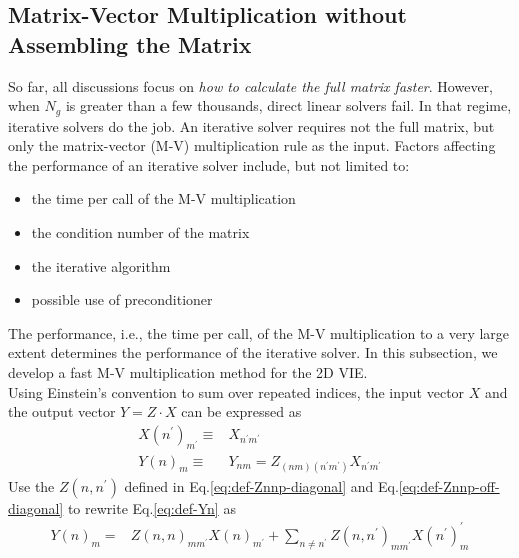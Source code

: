 \documentclass [10pt,letterpaper]{article}
\begin{document}
\subsection{Matrix-Vector Multiplication without Assembling the Matrix}
\label{sub:matrix-vector-multiplication-without-assembling-the-matrix}
So far, all discussions focus on \emph{how to calculate the full matrix faster}.
However, when $N_g$ is greater than a few thousands, direct linear solvers fail. 
In that regime, iterative solvers do the job. 
An iterative solver requires not the full matrix, but only the matrix-vector (M-V) multiplication rule as the input. 
Factors affecting the performance of an iterative solver include, but not limited to:
\begin{itemize}
	\item the time per call of the M-V multiplication
	\item the condition number of the matrix
	\item the iterative algorithm
	\item possible use of preconditioner
\end{itemize}
The performance, i.e., the time per call, of the M-V multiplication to a very large extent determines the performance of the iterative solver.  
In this subsection, we develop a fast M-V multiplication method for the 2D VIE.
\\
Using Einstein's convention to sum over repeated indices, the input vector $X$ and the output vector $Y=Z\cdot X$ can be expressed as
\begin{subequations} %
	\begin{align}
		X(n^\prime)_{m^\prime}
		\equiv
		&
		X_{n^\prime m^\prime}
		\label{eq:def-Xn}
		\\
		Y(n)_{m}
		\equiv
		&
		Y_{n m}
		=
		Z_{(n m)(n^\prime m^\prime)}
		X_{n^\prime m^\prime}
		\label{eq:def-Yn}
	\end{align}
\end{subequations}
Use the $Z(n,n^\prime)$ defined in Eq.\eqref{eq:def-Znnp-diagonal} and Eq.\eqref{eq:def-Znnp-off-diagonal} to rewrite Eq.\eqref{eq:def-Yn} as
\begin{equation} \label{eq:def-Yn-2}
	\begin{split}
		Y(n)_m
		=& 
		Z(n,n)_{m m^\prime}
		X(n)_{m^\prime}
		+
		\sum\nolimits_{n\neq n^\prime}
		Z(n,n^\prime)_{m m^\prime}
		X(n^\prime)_m^\prime
	\end{split}
\end{equation}
\end{document}
